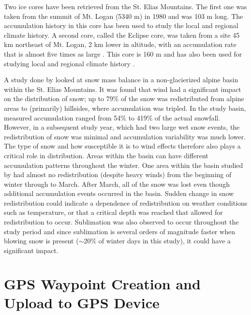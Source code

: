 \documentclass{sfuthesis}
\begin{document}
{\begin{appendices}
Two ice cores have been retrieved from the St. Elias Mountains. The first one was taken from the summit of Mt. Logan (5340 m) in 1980 and was 103 m long. The accumulation history in this core has been used to study the local \citep{Holdsworth1991} and regional \citep{Moore2002} climate history. A second core, called the Eclipse core, was taken from a site 45 km northeast of Mt. Logan, 2 km lower in altitude, with an accumulation rate that is almost five times as large \citep{Wake2002}. This core is 160 m and has also been used for studying local and regional climate history \citep{Wake2002}. 

A study done by \cite{Pomeroy1999} looked at snow mass balance in a non-glacierized alpine basin within the St. Elias Mountains. It was found that wind had a significant impact on the distribution of snow; up to 79$\%$ of the snow was redistributed from alpine areas to (primarily) hillsides, where accumulation was tripled. In the study basin, measured accumulation ranged from 54$\%$ to 419$\%$ of the actual snowfall. However, in a subsequent study year, which had two large wet snow events, the redistribution of snow was minimal and accumulation variability was much lower. The type of snow and how susceptible it is to wind effects therefore also plays a critical role in distribution. Areas within the basin can have different accumulation patterns throughout the winter. One area within the basin studied by \cite{Pomeroy1999} had almost no redistribution (despite heavy winds) from the beginning of winter through to March. After March, all of the snow was lost even though additional accumulation events occurred in the basin. Sudden change in snow redistribution could indicate a dependence of redistribution on weather conditions such as temperature, or that a critical depth was reached that allowed for redistribution to occur. Sublimation was also observed to occur throughout the study period and since sublimation is several orders of magnitude faster when blowing snow is present ($\sim$20\% of winter days in this study), it could have a significant impact.


	\chapter{GPS Waypoint Creation and Upload to GPS Device}
	\label{app:GPSwaypoints}


\end{appendices}}
\end{document}
